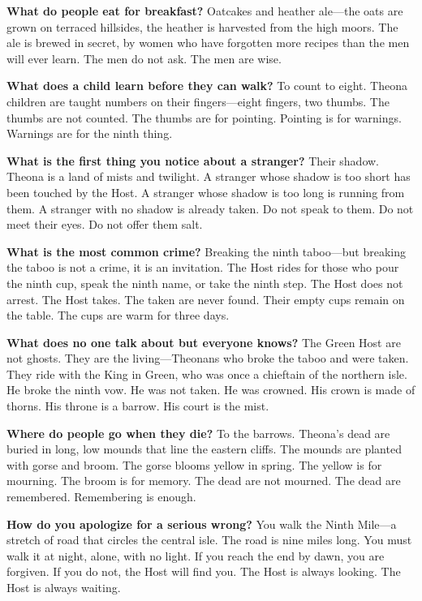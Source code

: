 \vspace{1em}

\begin{almanac}
\textbf{What do people eat for breakfast?} Oatcakes and heather ale---the oats are grown on terraced hillsides, the heather is harvested from the high moors. The ale is brewed in secret, by women who have forgotten more recipes than the men will ever learn. The men do not ask. The men are wise.

\textbf{What does a child learn before they can walk?} To count to eight. Theona children are taught numbers on their fingers---eight fingers, two thumbs. The thumbs are not counted. The thumbs are for pointing. Pointing is for warnings. Warnings are for the ninth thing.

\textbf{What is the first thing you notice about a stranger?} Their shadow. Theona is a land of mists and twilight. A stranger whose shadow is too short has been touched by the Host. A stranger whose shadow is too long is running from them. A stranger with no shadow is already taken. Do not speak to them. Do not meet their eyes. Do not offer them salt.

\textbf{What is the most common crime?} Breaking the ninth taboo---but breaking the taboo is not a crime, it is an invitation. The Host rides for those who pour the ninth cup, speak the ninth name, or take the ninth step. The Host does not arrest. The Host takes. The taken are never found. Their empty cups remain on the table. The cups are warm for three days.

\textbf{What does no one talk about but everyone knows?} The Green Host are not ghosts. They are the living---Theonans who broke the taboo and were taken. They ride with the King in Green, who was once a chieftain of the northern isle. He broke the ninth vow. He was not taken. He was crowned. His crown is made of thorns. His throne is a barrow. His court is the mist.

\textbf{Where do people go when they die?} To the barrows. Theona's dead are buried in long, low mounds that line the eastern cliffs. The mounds are planted with gorse and broom. The gorse blooms yellow in spring. The yellow is for mourning. The broom is for memory. The dead are not mourned. The dead are remembered. Remembering is enough.

\textbf{How do you apologize for a serious wrong?} You walk the Ninth Mile---a stretch of road that circles the central isle. The road is nine miles long. You must walk it at night, alone, with no light. If you reach the end by dawn, you are forgiven. If you do not, the Host will find you. The Host is always looking. The Host is always waiting.


\end{almanac}
